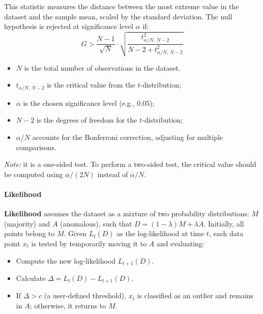 This statistic measures the distance between the most extreme value in the dataset and the sample mean, scaled by the standard deviation. The null hypothesis is rejected at significance level $\alpha$ if:
\begin{equation}
    G > \frac{N - 1}{\sqrt{N}} \cdot \sqrt{ \frac{t^2_{\alpha/N,\, N - 2}}{N - 2 + t^2_{\alpha/N,\, N - 2}} }
\end{equation}
\begin{itemize}
    \item $N$ is the total number of observations in the dataset.
    \item $t_{\alpha/N,\, N - 2}$ is the critical value from the $t$-distribution;
    \item $\alpha$ is the chosen significance level (e.g., $0.05$);
    \item $N - 2$ is the degrees of freedom for the $t$-distribution;
    \item $\alpha/N$ accounts for the Bonferroni correction, adjusting for multiple comparisons.
\end{itemize}

\textit{Note:} it is a one-sided test. To perform a two-sided test, the critical value should be computed using $\alpha/(2N)$ instead of $\alpha/N$.


\paragraph{Likelihood}
\textbf{Likelihood} assumes the dataset as a mixture of two probability distributions: $M$ (majority) and $A$ (anomalous), such that $D = (1-\lambda)M + \lambda A$. Initially, all points belong to $M$. Given $L_t(D)$ as the log-likelihood at time $t$, each data point $x_t$ is tested by temporarily moving it to $A$ and evaluating:

\begin{itemize}
    \item Compute the new log-likelihood $L_{t+1}(D)$.
    \item Calculate $\Delta = L_t(D) - L_{t+1}(D)$.
    \item If $\Delta > c$ (a user-defined threshold), $x_t$ is classified as an outlier and remains in $A$; otherwise, it returns to $M$.
\end{itemize}

